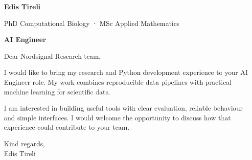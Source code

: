 \documentclass[11pt,a4paper]{article}
\begin{document}
{\fontsize{34}{38}\selectfont\bfseries Edis Tireli}\par\vspace{1mm}
{\small\color{muted}PhD Computational Biology · MSc Applied Mathematics}\par

\par

\vspace{4mm}{\color{muted}\hrule}\vspace{6mm}
{\fontsize{18}{23}\selectfont\bfseries AI Engineer}\par{}\par\vspace{8mm}
Dear Nordsignal Research team,

I would like to bring my research and Python development experience to your AI Engineer role. My work combines reproducible data pipelines with practical machine learning for scientific data.

I am interested in building useful tools with clear evaluation, reliable behaviour and simple interfaces. I would welcome the opportunity to discuss how that experience could contribute to your team.
\par\vspace{5mm}Kind regards,\\Edis Tireli

\vfill\vspace{8mm}\par
\end{document}
